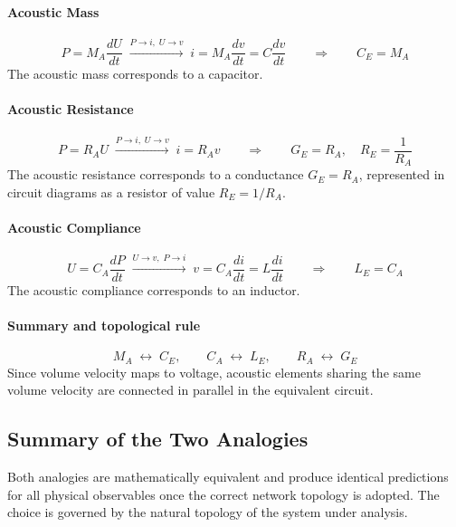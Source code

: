 \paragraph{Acoustic Mass}
\[
P = M_A\frac{dU}{dt}
\;\xrightarrow{P\to i,\;U\to v}\;
i = M_A\frac{dv}{dt} = C\frac{dv}{dt}
\qquad\Longrightarrow\qquad
C_E = M_A
\]
The acoustic mass corresponds to a capacitor.

\paragraph{Acoustic Resistance}
\[
P = R_A U
\;\xrightarrow{P\to i,\;U\to v}\;
i = R_A v
\qquad\Longrightarrow\qquad
G_E = R_A, \quad R_E = \frac{1}{R_A}
\]
The acoustic resistance corresponds to a conductance \(G_E = R_A\), represented in circuit diagrams as a resistor of value \(R_E = 1/R_A\).

\paragraph{Acoustic Compliance}
\[
U = C_A\frac{dP}{dt}
\;\xrightarrow{U\to v,\;P\to i}\;
v = C_A\frac{di}{dt} = L\frac{di}{dt}
\qquad\Longrightarrow\qquad
L_E = C_A
\]
The acoustic compliance corresponds to an inductor.

\paragraph{Summary and topological rule}
\[
M_A \;\leftrightarrow\; C_E,
\qquad C_A \;\leftrightarrow\; L_E,
\qquad R_A \;\leftrightarrow\; G_E
\]
Since volume velocity maps to voltage, acoustic elements sharing the same volume velocity are connected in parallel in the equivalent circuit.

\subsection{Summary of the Two Analogies}
\label{ssc:323}

Both analogies are mathematically equivalent and produce identical predictions for all physical observables once the correct network topology is adopted. The choice is governed by the natural topology of the system under analysis.

